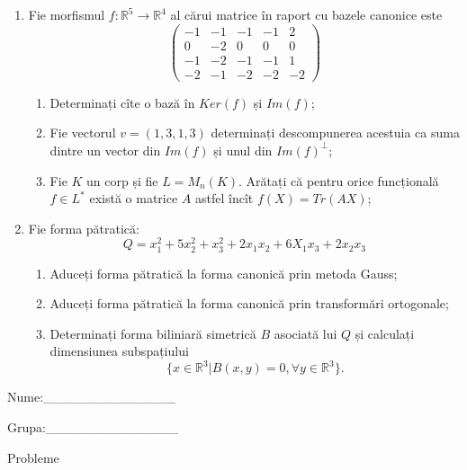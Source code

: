 \documentclass{article}
\begin{document}
\begin{enumerate}
 \item Fie morfismul $f:\mathbb{R}^5 \to \mathbb{R}^4$ al cărui matrice în raport cu bazele canonice este
$$\begin{pmatrix}
-1&-1&-1&-1&2\\
0&-2&0&0&0\\
-1&-2&-1&-1&1\\
-2&-1&-2&-2&-2
\end{pmatrix}$$

\begin{enumerate}
\item Determinați cîte o bază în $Ker(f)$ și $Im(f)$;
\item Fie vectorul $v=(1,3,1,3)$ determinați descompunerea acestuia ca suma dintre un vector din $Im(f)$ și unul din $Im(f)^\perp$;
\item Fie $K$ un corp și fie $L=M_n(K)$. Arătați că pentru orice funcțională $f \in L^*$ există o matrice $A$ astfel încît $f(X)=Tr(AX)$;
\end{enumerate}
\item Fie forma pătratică:
$$Q= x_1^2+5x_2^2+x_3^2+2x_1x_2+6X_1x_3+2x_2x_3$$

\begin{enumerate}
\item Aduceți forma pătratică la forma canonică prin metoda Gauss;
\item Aduceți forma pătratică la forma canonică prin transformări ortogonale;
\item Determinați forma biliniară simetrică $B$ asociată lui $Q$ și calculați dimensiunea subspațiului
$$\{x \in \mathbb{R}^3 | B(x,y)=0,\forall y \in \mathbb{R}^3\}.$$

\end{enumerate}
\end{enumerate}
\newpage
\begin{flushright}
Nume:\_\_\_\_\_\_\_\_\_\_\_\_\_\_
 
 
Grupa:\_\_\_\_\_\_\_\_\_\_\_\_\_\_
\end{flushright}
\begin{center}
\vspace{2cm}
{\Large Probleme}
\vspace{2cm}
\end{center}
\end{document}
